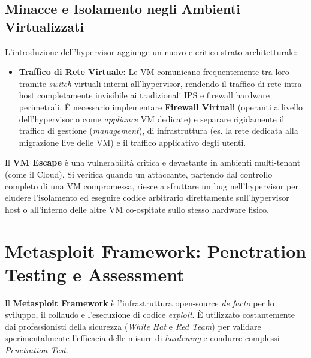 \subsection{Minacce e Isolamento negli Ambienti Virtualizzati}
L'introduzione dell'hypervisor aggiunge un nuovo e critico strato architetturale:
\begin{itemize}
    \item \textbf{Traffico di Rete Virtuale:} Le VM comunicano frequentemente tra loro tramite \textit{switch} virtuali interni all'hypervisor, rendendo il traffico di rete intra-host completamente invisibile ai tradizionali IPS e firewall hardware perimetrali. È necessario implementare \textbf{Firewall Virtuali} (operanti a livello dell'hypervisor o come \textit{appliance} VM dedicate) e separare rigidamente il traffico di gestione (\textit{management}), di infrastruttura (es. la rete dedicata alla migrazione live delle VM) e il traffico applicativo degli utenti.
\end{itemize}

\begin{warnbox}[VM Escape]
Il \textbf{VM Escape} è una vulnerabilità critica e devastante in ambienti multi-tenant (come il Cloud). Si verifica quando un attaccante, partendo dal controllo completo di una VM compromessa, riesce a sfruttare un bug nell'hypervisor per eludere l'isolamento ed eseguire codice arbitrario direttamente sull'hypervisor host o all'interno delle altre VM co-ospitate sullo stesso hardware fisico.
\end{warnbox}

\section{Metasploit Framework: Penetration Testing e Assessment}
Il \textbf{Metasploit Framework} è l'infrastruttura open-source \textit{de facto} per lo sviluppo, il collaudo e l'esecuzione di codice \textit{exploit}. È utilizzato costantemente dai professionisti della sicurezza (\textit{White Hat} e \textit{Red Team}) per validare sperimentalmente l'efficacia delle misure di \textit{hardening} e condurre complessi \textit{Penetration Test}.

